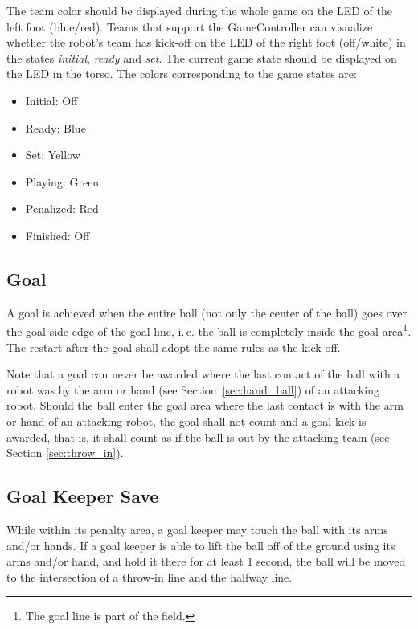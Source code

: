 \documentclass[12pt]{article}
\newcommand{\ie}{\mbox{i.\,e.}\xspace}
\begin{document}
The team color should be displayed during the whole game on the LED of the left foot (blue/red). Teams that support the GameController can visualize whether the robot's team has kick-off on the LED of the right foot (off/white) in the states \emph{initial}, \emph{ready} and \emph{set}. The current game state should be displayed on the LED in the torso. The colors corresponding to the game states are:

\begin{itemize}

\item Initial: Off

\item Ready: Blue

\item Set: Yellow

\item Playing: Green

\item Penalized: Red

\item Finished: Off

\end{itemize}

\subsection{Goal}

A goal is achieved when the entire ball (not only the center of the ball) goes over the goal-side edge of the goal line, \ie the ball is completely inside the goal area\footnote{The goal line is part of the field.}. The restart after the goal shall adopt the same rules as the kick-off.

Note that a goal can never be awarded where the last contact of the ball with a robot was by the arm or hand (see Section~\ref{sec:hand_ball}) of an attacking robot. Should the ball enter the goal area where the last contact is with the arm or hand of an attacking robot, the goal shall not count and a goal kick is awarded, that is, it shall count as if the ball is out by the attacking team (see Section \ref{sec:throw_in}).

\subsection{Goal Keeper Save}
\label{sec:goalie_save}
While within its penalty area, a goal keeper may touch the ball with its arms and/or hands.  If a goal keeper is able to lift the ball off of the ground using its arms and/or hand, and hold it there for at least 1 second, the ball will be moved to the intersection of a throw-in line and the halfway line.
\end{document}
